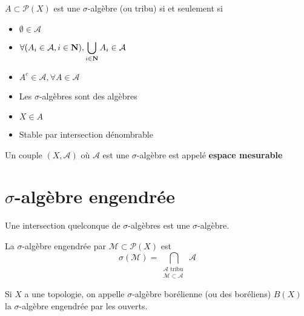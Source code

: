 \begin{dfn}
    $A\subset \mathcal  P(X)$ est une $\sigma$-algèbre (ou tribu) si et seulement si
    \begin{itemize}
        \item $\emptyset \in  \mathcal  A$
        \item $\displaystyle \forall  (A_i \in  \mathcal A, i \in  \mathbf N), \bigcup_{i \in  \mathbf N} A_i \in  \mathcal  A$
        \item $A^c \in  \mathcal  A, \forall  A \in  \mathcal  A$
    \end{itemize}
\end{dfn}

\begin{rem}
\begin{itemize}
    \item Les $\sigma$-algèbres sont des algèbres
    \item $X \in  A$
    \item Stable par intersection dénombrable
\end{itemize}
\end{rem}

\begin{dfn}
    Un couple $(X, \mathcal  A)$ où $\mathcal  A$ est une $\sigma$-algèbre est appelé \textbf{espace mesurable}
\end{dfn}

\section{$\sigma$-algèbre  engendrée}

\begin{lmm}
Une intersection quelconque de $\sigma$-algèbres est une $\sigma$-algèbre.
\end{lmm}

\begin{dfn}
    La $\sigma$-algèbre engendrée par  $\mathcal  M \subset \mathcal  P(X)$ est \[
        \sigma(\mathcal  M)=\bigcap_{\substack{\mathcal A \text{ tribu }\\ \mathcal  M \subset \mathcal  A}}\mathcal  A
    \] 
\end{dfn}

\begin{dfn}[Boréliens]
    Si $X$ a une topologie, on appelle  $\sigma$-algèbre borélienne (ou des boréliens)  $B(X)$ la  $\sigma$-algèbre engendrée par les ouverts.
\end{dfn}

